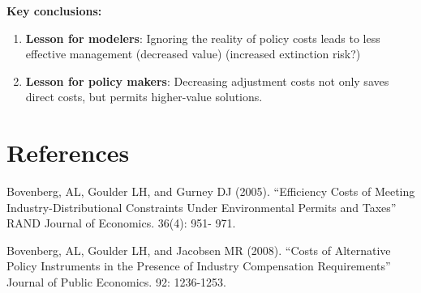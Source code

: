 \documentclass[authoryear, review, 12pt]{elsarticle}
\begin{document}
\textbf{Key conclusions:}
\begin{enumerate}
  \item \textbf{Lesson for modelers}: Ignoring the reality of policy costs leads to less effective management (decreased value)  (increased extinction risk?)
  \item \textbf{Lesson for policy makers}: Decreasing adjustment costs not only saves direct costs, but permits higher-value solutions.
\end{enumerate}


\section*{References}

Bovenberg, AL, Goulder LH, and Gurney DJ (2005).  “Efficiency Costs of Meeting Industry-Distributional  Constraints Under Environmental Permits and Taxes” RAND Journal of Economics. 36(4): 951-  971.

Bovenberg, AL, Goulder LH, and Jacobsen MR (2008).  “Costs of Alternative Policy Instruments in the    Presence of Industry Compensation Requirements” Journal of Public Economics. 92: 1236-1253.

\end{document}
